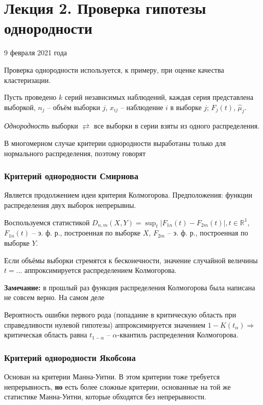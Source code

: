 \documentclass[main.tex]{subfiles}
\begin{document}
\section{Лекция 2. Проверка гипотезы однородности}

9 февраля 2021 года

Проверка однородности используется, к примеру, при оценке качества кластеризации.

Пусть проведено $ k $ серий независимых наблюдений, каждая серия представлена выборкой, $ n_j $ -- объём выборки $j$, $ x_{ij} $ -- наблюдение $i$ в выборке $j$; $F_j(t)$, $\hat \mu_j$.

\emph{Однородность} выборки $ \rightleftarrows $ все выборки в серии взяты из одного распределения.

В многомерном случае критерии однородности выработаны только для нормального распределения, поэтому говорят %

\subsubsection{Критерий однородности Смирнова}

Является продолжением идеи критерия Колмогорова.
Предположения: функции распределения двух выборок непрерывны.

Воспользуемся статистикой $ D_{n,m}(X,Y) = \sup_t|F_{1n}(t)-F_{2m}(t)|, t \in \mathds{R}^1 $, $ F_{1n}(t) $ -- э. ф. р., построенная по выборке $ X $, $ F_{2m} $ -- э. ф. р., построенная по выборке $ Y $.

Если объёмы выборки стремятся к бесконечности, значение случайной величины $ t = ... $ %
аппроксимируется распределением Колмогорова.

\textbf{Замечание:} в прошлый раз функция распределения Колмогорова была написана не совсем верно. На самом деле $ $ %

Вероятность ошибки первого рода (попадание в критическую область при справедливости нулевой гипотезы) аппроксимируется значением $ 1 - K(t_\alpha) \Rightarrow $ критическая область равна $ t_{1-\alpha} $ -- $ \alpha $-квантиль распределения Колмогорова.

\subsubsection{Критерий однородности Якобсона}

Основан на критерии Манна-Уитни.
В этом критерии тоже требуется непрерывность, \textbf{но} есть более сложные критерии, основанные на той же статистике Манна-Уитни, которые обходятся без непрерывности.
\end{document}
